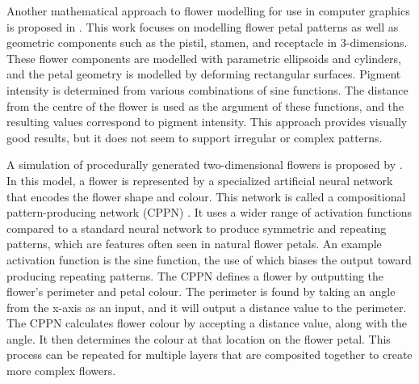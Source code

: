 Another mathematical approach to flower modelling for use in computer graphics is proposed in \citep{lu2014}. This work focuses on modelling flower petal patterns as well as geometric components such as the pistil, stamen, and receptacle in 3-dimensions. These flower components are modelled with parametric ellipsoids and cylinders, and the petal geometry is modelled by deforming rectangular surfaces. Pigment intensity is determined from various combinations of sine functions. The distance from the centre of the flower is used as the argument of these functions, and the resulting values correspond to pigment intensity. This approach provides visually good results, but it does not seem to support irregular or complex patterns.


A simulation of procedurally generated two-dimensional flowers is proposed by \citet{risi2012}. In this model, a flower is represented by a specialized artificial neural network that encodes the flower shape and colour. This network is called a compositional pattern-producing network (CPPN) \citep{stanley2007}. It uses a wider range of activation functions compared to a standard neural network to produce symmetric and repeating patterns, which are features often seen in natural flower petals. An example activation function is the sine function, the use of which biases the output toward producing repeating patterns. The CPPN defines a flower by outputting the flower's perimeter and petal colour. The perimeter is found by taking an angle from the x-axis as an input, and it will output a distance value to the perimeter. The CPPN calculates flower colour by accepting a distance value, along with the angle. It then determines the colour at that location on the flower petal. This process can be repeated for multiple layers that are composited together to create more complex flowers. 

